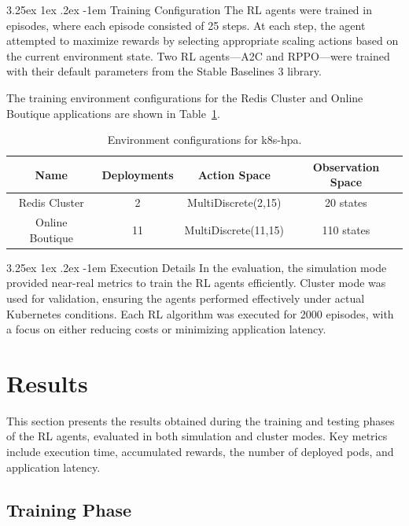 \documentclass[conference]{IEEEtran}
\makeatletter
\renewcommand\paragraph{\@startsection{paragraph}{5}{\z@}%
  {3.25ex \@plus1ex \@minus.2ex}%
  {-1em}%
  {\normalfont\normalsize\bfseries}}
\makeatother
\begin{document}
\paragraph{Training Configuration}
The RL agents were trained in episodes, where each episode consisted of 25 steps. At each step, the agent attempted to maximize rewards by selecting appropriate scaling actions based on the current environment state. Two RL agents—A2C and RPPO—were trained with their default parameters from the Stable Baselines 3 library.

The training environment configurations for the Redis Cluster and Online Boutique applications are shown in Table~\ref{tab:environment-config}.

\begin{table}[h]
    \centering
    \caption{Environment configurations for k8s-hpa.}
    \label{tab:environment-config}
    \begin{tabular}{|c|c|c|c|}
        \hline
        \textbf{Name} & \textbf{Deployments} & \textbf{Action Space} & \textbf{Observation Space} \\
        \hline
        Redis Cluster & 2 & MultiDiscrete(2,15) & 20 states \\
        Online Boutique & 11 & MultiDiscrete(11,15) & 110 states \\
        \hline
    \end{tabular}
\end{table}

\paragraph{Execution Details}
In the evaluation, the simulation mode provided near-real metrics to train the RL agents efficiently. Cluster mode was used for validation, ensuring the agents performed effectively under actual Kubernetes conditions. Each RL algorithm was executed for 2000 episodes, with a focus on either reducing costs or minimizing application latency.


\section{Results}
\label{sec:results}
This section presents the results obtained during the training and testing phases of the RL agents, evaluated in both simulation and cluster modes. Key metrics include execution time, accumulated rewards, the number of deployed pods, and application latency.

\subsection{Training Phase}
\end{document}
